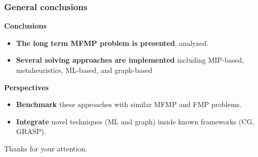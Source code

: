 \begin{frame}
\frametitle{\textbf{General conclusions}}
  \begin{block}{\textbf{Conclusions}}
    \begin{itemize}
    \item \textbf{The long term MFMP problem is presented}, analyzed.
    \item \textbf{Several solving approaches are implemented}
      including MIP-based, metaheuristics, ML-based, and graph-based
    \end{itemize}
  \end{block}  
  \pause
  \begin{block}{\textbf{Perspectives}}
    \begin{itemize}
      \item \textbf{Benchmark} these approaches with similar MFMP and FMP problems.
      \item \textbf{Integrate} novel techniques (ML and graph) inside known frameworks (CG, GRASP).
    \end{itemize}
  \end{block}
  \pause
  Thanks for your attention.
\end{frame}

